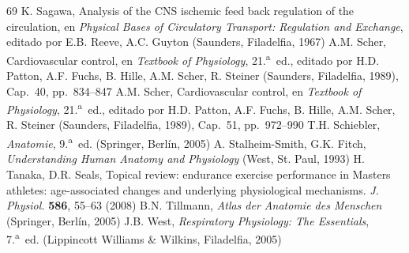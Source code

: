 \documentclass[12pt]{book}
\begin{document}
\begin{thebibliography}{69}
 K. Sagawa, Analysis of the CNS ischemic feed back regulation of the circulation, en \textit{Physical Bases of Circulatory Transport: Regulation and Exchange}, editado por E.B. Reeve, A.C. Guyton (Saunders, Filadelfia, 1967)
 A.M. Scher, Cardiovascular control, en \textit{Textbook of Physiology}, 21.\textsuperscript{a}~ed., editado por H.D. Patton, A.F. Fuchs, B. Hille, A.M. Scher, R. Steiner (Saunders, Filadelfia, 1989), Cap.~40, pp.~834--847
 A.M. Scher, Cardiovascular control, en \textit{Textbook of Physiology}, 21.\textsuperscript{a}~ed., editado por H.D. Patton, A.F. Fuchs, B. Hille, A.M. Scher, R. Steiner (Saunders, Filadelfia, 1989), Cap.~51, pp.~972--990
 T.H. Schiebler, \textit{Anatomie}, 9.\textsuperscript{a}~ed. (Springer, Berlín, 2005)
 A. Stalheim-Smith, G.K. Fitch, \textit{Understanding Human Anatomy and Physiology} (West, St. Paul, 1993)
 H. Tanaka, D.R. Seals, Topical review: endurance exercise performance in Masters athletes: age-associated changes and underlying physiological mechanisms. \textit{J. Physiol.} \textbf{586}, 55--63 (2008)
 B.N. Tillmann, \textit{Atlas der Anatomie des Menschen} (Springer, Berlín, 2005)
 J.B. West, \textit{Respiratory Physiology: The Essentials}, 7.\textsuperscript{a}~ed. (Lippincott Williams \& Wilkins, Filadelfia, 2005)
\end{thebibliography}

\end{document}
